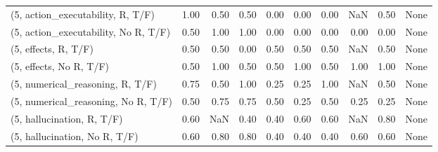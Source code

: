 \begin{table*}[h!]
\begin{adjustbox}{width=2\columnwidth,center}
\begin{tabular}{lrrr|rrr|rrr}
(5, action\_executability, R, T/F)    &                      1.00 &                  0.50 &                      0.50 &                          0.00 &                      0.00 &                          0.00 &                                    NaN &                               0.50 &                                  None \\
(5, action\_executability, No R, T/F) &                      0.50 &                  1.00 &                      1.00 &                          0.00 &                      0.00 &                          0.00 &                                   0.00 &                               0.00 &                                  None \\
(5, effects, R, T/F)                 &                      0.50 &                  0.50 &                      0.00 &                          0.50 &                      0.50 &                          0.50 &                                    NaN &                               0.50 &                                  None \\
(5, effects, No R, T/F)              &                      0.50 &                  1.00 &                      0.50 &                          0.50 &                      1.00 &                          0.50 &                                   1.00 &                               1.00 &                                  None \\
(5, numerical\_reasoning, R, T/F)     &                      0.75 &                  0.50 &                      1.00 &                          0.25 &                      0.25 &                          1.00 &                                    NaN &                               0.50 &                                  None \\
(5, numerical\_reasoning, No R, T/F)  &                      0.50 &                  0.75 &                      0.75 &                          0.50 &                      0.25 &                          0.50 &                                   0.25 &                               0.25 &                                  None \\
(5, hallucination, R, T/F)           &                      0.60 &                   NaN &                      0.40 &                          0.40 &                      0.60 &                          0.60 &                                    NaN &                               0.80 &                                  None \\
(5, hallucination, No R, T/F)        &                      0.60 &                  0.80 &                      0.80 &                          0.40 &                      0.40 &                          0.40 &                                   0.60 &                               0.60 &                                  None \\

\end{tabular}
\end{adjustbox}
\end{table*}
